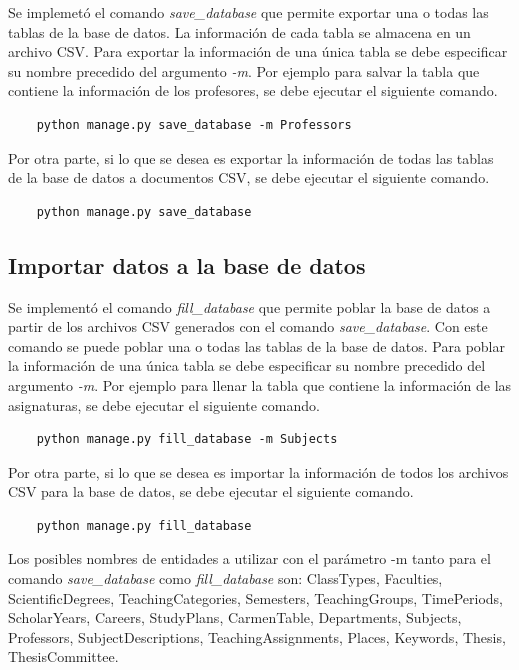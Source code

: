 Se implemetó el comando \textit{save\_database}
que permite exportar una o todas las tablas de la base de datos.
La información de cada tabla se almacena en un archivo CSV.
Para exportar la información de una única tabla
se debe especificar su nombre precedido del argumento \textit{-m}. Por 
ejemplo para salvar la tabla que contiene la información de los profesores, se debe 
ejecutar el siguiente comando.

\begin{verbatim}
    python manage.py save_database -m Professors
\end{verbatim}


Por otra parte, si lo que se desea es exportar la información de todas las tablas 
de la base de datos a documentos CSV, se debe ejecutar el siguiente comando.

\begin{verbatim}
    python manage.py save_database
\end{verbatim}


\subsection{Importar datos a la base de datos}
Se implementó el comando \textit{fill\_database} que permite poblar la 
base de datos a partir de los archivos CSV generados con el comando \textit{save\_database}.
Con este comando se puede poblar una o todas las tablas de la base de 
datos. 
Para poblar la información de una única tabla
se debe especificar su nombre precedido del argumento \textit{-m}. Por 
ejemplo para llenar la tabla que contiene la información de las asignaturas, se debe 
ejecutar el siguiente comando.

\begin{verbatim}
    python manage.py fill_database -m Subjects
\end{verbatim}

Por otra parte, si lo que se desea es importar la información de todos los archivos CSV  
para la base de datos, se debe ejecutar el siguiente comando.

\begin{verbatim}
    python manage.py fill_database
\end{verbatim}


Los posibles nombres de entidades a utilizar con
el parámetro -m tanto para el comando 
\textit{save\_database} como \textit{fill\_database} son:
ClassTypes, Faculties,
ScientificDegrees, TeachingCategories,
Semesters, TeachingGroups, TimePeriods, ScholarYears,
Careers, StudyPlans, CarmenTable, Departments,
Subjects, Professors, SubjectDescriptions, TeachingAssignments,
Places, Keywords, Thesis, ThesisCommittee.



